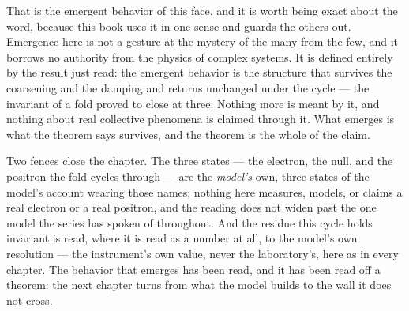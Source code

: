 That is the emergent behavior of this face, and it is worth being exact about the
word, because this book uses it in one sense and guards the others out. Emergence
here is not a gesture at the mystery of the many-from-the-few, and it borrows no
authority from the physics of complex systems. It is defined entirely by the
result just read: the emergent behavior is the structure that survives the
coarsening and the damping and returns unchanged under the cycle --- the
invariant of a fold proved to close at three. Nothing more is meant by it, and
nothing about real collective phenomena is claimed through it. What emerges is
what the theorem says survives, and the theorem is the whole of the claim.

Two fences close the chapter. The three states --- the electron, the null, and
the positron the fold cycles through --- are the \emph{model's} own, three states
of the model's account wearing those names; nothing here measures, models, or
claims a real electron or a real positron, and the reading does not widen past
the one model the series has spoken of throughout. And the residue this cycle
holds invariant is read, where it is read as a number at all, to the model's own
resolution --- the instrument's own value, never the laboratory's, here as in
every chapter. The behavior that emerges has been read, and it has been read off
a theorem: the next chapter turns from what the model builds to the wall it does
not cross.
